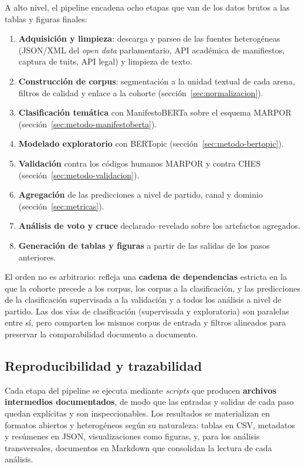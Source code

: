 A alto nivel, el pipeline encadena ocho etapas que van de los datos brutos a las
tablas y figuras finales:
\begin{enumerate}
  \item \textbf{Adquisición y limpieza}: descarga y parseo de las fuentes
        heterogéneas (JSON/XML del \emph{open data} parlamentario, API académica
        de manifiestos, captura de tuits, API legal) y limpieza de texto.
  \item \textbf{Construcción de corpus}: segmentación a la unidad textual de cada
        arena, filtros de calidad y enlace a la cohorte
        (sección~\ref{sec:normalizacion}).
  \item \textbf{Clasificación temática} con ManifestoBERTa sobre el esquema
        MARPOR (sección~\ref{sec:metodo-manifestoberta}).
  \item \textbf{Modelado exploratorio} con BERTopic
        (sección~\ref{sec:metodo-bertopic}).
  \item \textbf{Validación} contra los códigos humanos MARPOR y contra CHES
        (sección~\ref{sec:metodo-validacion}).
  \item \textbf{Agregación} de las predicciones a nivel de partido, canal y
        dominio (sección~\ref{sec:metricas}).
  \item \textbf{Análisis de voto y cruce} declarado--revelado sobre los
        artefactos agregados.
  \item \textbf{Generación de tablas y figuras} a partir de las salidas de los
        pasos anteriores.
\end{enumerate}
El orden no es arbitrario: refleja una \textbf{cadena de dependencias} estricta
en la que la cohorte precede a los corpus, los corpus a la clasificación, y las
predicciones de la clasificación supervisada a la validación y a todos los
análisis a nivel de partido. Las dos vías de clasificación (supervisada y
exploratoria) son paralelas entre sí, pero comparten los mismos corpus de entrada
y filtros alineados para preservar la comparabilidad documento a documento.

\subsection{Reproducibilidad y trazabilidad}
\label{sec:arq-reproducibilidad}

Cada etapa del pipeline se ejecuta mediante \emph{scripts} que producen
\textbf{archivos intermedios documentados}, de modo que las entradas y salidas de
cada paso quedan explícitas y son inspeccionables. Los resultados se materializan
en formatos abiertos y heterogéneos según su naturaleza: tablas en CSV,
metadatos y resúmenes en JSON, visualizaciones como figuras, y, para los análisis
transversales, documentos en Markdown que consolidan la lectura de cada análisis.

